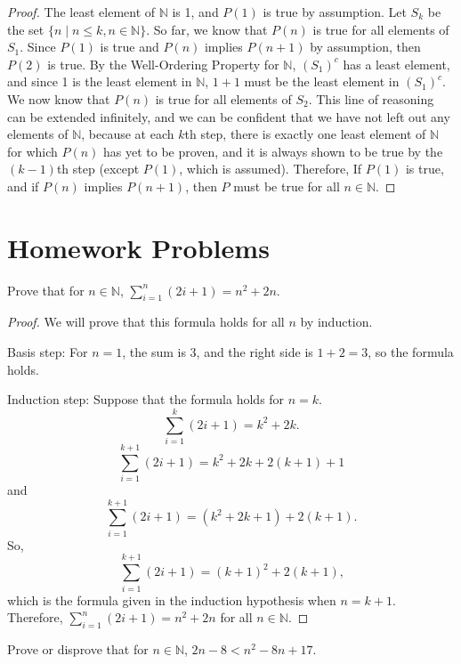 \documentclass[10pt,letterpaper]{article}
\newcommand{\N}{\mathbb{N}}
\newcommand{\period}{\text{.}}
\newenvironment{problem}[2][Problem]{\begin{trivlist}
\item[\hskip \labelsep {\bfseries #1}\hskip \labelsep {\bfseries #2.}]}{\end{trivlist}}
\begin{document}
\begin{proof}
The least element of $\N$ is 1, and $P(1)$ is true by assumption. Let $S_k$ be the set $\{n \mid n \leq k, n \in \N\}$. So far, we know that $P(n)$ is true for all elements of $S_1$. Since $P(1)$ is true and $P(n)$ implies $P(n+1)$ by assumption, then $P(2)$ is true. By the Well-Ordering Property for $\N$, $(S_1)^c$ has a least element, and since 1 is the least element in $\N$, $1+1$ must be the least element in $(S_1)^c$. We now know that $P(n)$ is true for all elements of $S_2$. This line of reasoning can be extended infinitely, and we can be confident that we have not left out any elements of $\N$, because at each $k$th step, there is exactly one least element of $\N$ for which $P(n)$ has yet to be proven, and it is always shown to be true by the $(k-1)$th step (except $P(1)$, which is assumed). Therefore, If $P(1)$ is true, and if $P(n)$ implies $P(n+1)$, then $P$ must be true for all $n \in \N$. \end{proof}

\pagebreak

\section*{Homework Problems}

\begin{problem}{3.5}
Prove that for $n \in \N$, $\sum_{i=1}^{n} (2i+1) = n^2 + 2n$.
\end{problem}

\begin{proof}
We will prove that this formula holds for all $n$ by induction. 

Basis step: For $n=1$, the sum is 3, and the right side is $1+2=3$, so the formula holds.

Induction step: Suppose that the formula holds for $n=k$. 
\\ 
$$ \sum_{i=1}^{k} (2i+1) = k^2 + 2k \period$$
$$ \sum_{i=1}^{k+1} (2i+1) = k^2 + 2k + 2(k+1)+1$$
and
$$\sum_{i=1}^{k+1} (2i+1) = (k^2 + 2k + 1) + 2(k+1) \text{.}$$
So,
$$\sum_{i=1}^{k+1} (2i+1) = (k+1)^2 + 2(k+1) \text{,}$$
which is the formula given in the induction hypothesis when $n=k+1$. Therefore, $\sum_{i=1}^{n} (2i+1) = n^2 + 2n$  for all $n \in \N$. 
\end{proof}

\begin{problem}{3.7}
Prove or disprove that for $n \in \N$, $2n-8<n^2 -8n+17$.
\end{problem}
\end{document}
